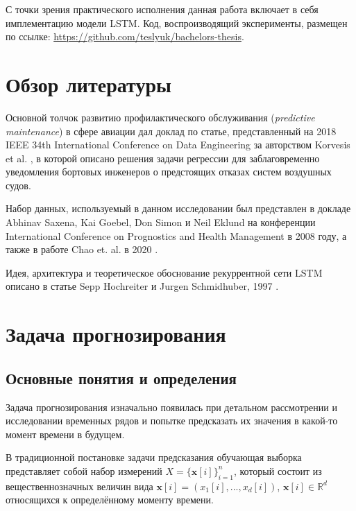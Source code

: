 \documentclass[14pt]{extarticle}
\newcommand{\R}{\mathbb{R}}
\begin{document}
С точки зрения практического исполнения данная работа включает в себя имплементацию модели LSTM. Код, воспроизводящий эксперименты, размещен по ссылке: \href{https://github.com/teslyuk/bachelors-thesis}{https://github.com/teslyuk/bachelors-thesis}.

\newpage

\section{Обзор литературы}

Основной толчок развитию профилактического обслуживания ({\it predictive maintenance}) в сфере авиации дал доклад по статье, представленный на 2018 IEEE 34th International Conference on Data Engineering за авторством Korvesis et al. \cite{Korvesis}, в которой описано решения задачи регрессии для заблаговременно уведомления бортовых инженеров о предстоящих отказах систем воздушных судов.

Набор данных, используемый в данном исследовании был представлен в докладе Abhinav Saxena, Kai Goebel, Don Simon и Neil Eklund \cite{Saxena} на конференции International Conference on Prognostics and Health Management в 2008 году, а также в работе Chao et. al. в 2020 \cite{Chao}.

Идея, архитектура и теоретическое обоснование рекуррентной сети LSTM описано в статье Sepp Hochreiter и Jurgen Schmidhuber, 1997 \cite{Hochreiter}.


\newpage

\section{Задача прогнозирования}

\subsection{Основные понятия и определения}

Задача прогнозирования изначально появилась при детальном рассмотрении и исследовании временных рядов и попытке предсказать их значения в какой-то момент времени в будущем. 

В традиционной постановке задачи предсказания обучающая выборка представляет собой набор измерений $X = \{\textbf{x}[i]\}_{i = 1}^n$, который состоит из вещественнозначных величин вида $\textbf{x}[i] = \left(x_1[i], . . . , x_d[i]\right)$, $\textbf{x}[i] \in \R^d$ относящихся к определённому моменту времени.
\end{document}
